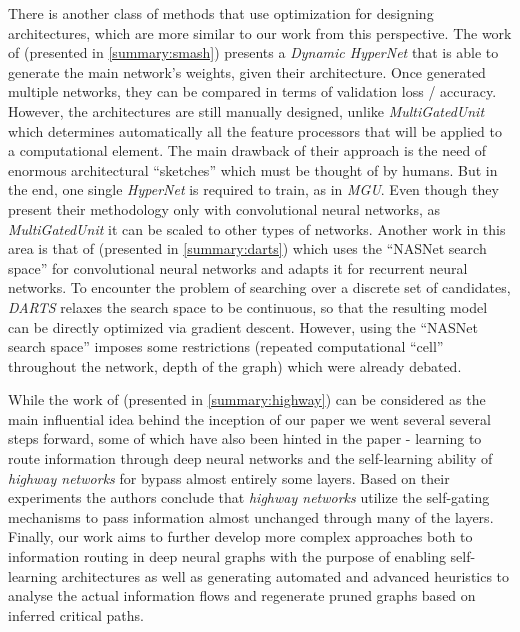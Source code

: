 \documentclass[conference]{IEEEtran}
\begin{document}
There is another class of methods that use optimization for designing architectures, which are more similar to our work from this perspective. The work of \cite{brock2017smash} (presented in \ref{summary:smash}) presents a \textit{Dynamic HyperNet} that is able to generate the main network’s weights, given their architecture. Once generated multiple networks, they can be compared in terms of validation loss / accuracy. However, the architectures are still manually designed, unlike \textit{MultiGatedUnit} which determines automatically all the feature processors that will be applied to a computational element. The main drawback of their approach is the need of enormous architectural “sketches'' which must be thought of by humans. But in the end, one single \textit{HyperNet} is required to train, as in \textit{MGU}. Even though they present their methodology only with convolutional neural networks, as \textit{MultiGatedUnit} it can be scaled to other types of networks. Another work in this area is that of \cite{Liu2018} (presented in \ref{summary:darts}) which uses the “NASNet search space” for convolutional neural networks and adapts it for recurrent neural networks. To encounter the problem of searching over a discrete set of candidates, \textit{DARTS} relaxes the search space to be continuous, so that the resulting model can be directly optimized via gradient descent. However, using the “NASNet search space” imposes some restrictions (repeated computational “cell” throughout the network, depth of the graph) which were already debated. 

While the work of \cite{srivastava2015highway} (presented in \ref{summary:highway}) can be considered as the main influential idea behind the inception of our paper we went several several steps forward, some of which have also been hinted in the paper - learning to route information through deep neural networks and the self-learning ability of \textit{highway networks} for bypass almost entirely some layers. Based on their experiments the authors conclude that \textit{highway networks} utilize the self-gating mechanisms to pass information almost unchanged through many of the layers. Finally, our work aims to further develop more complex approaches both to information routing in deep neural graphs with the purpose of enabling self-learning architectures as well as generating automated and advanced heuristics to analyse the actual information flows and regenerate pruned graphs based on inferred critical paths.
\end{document}

